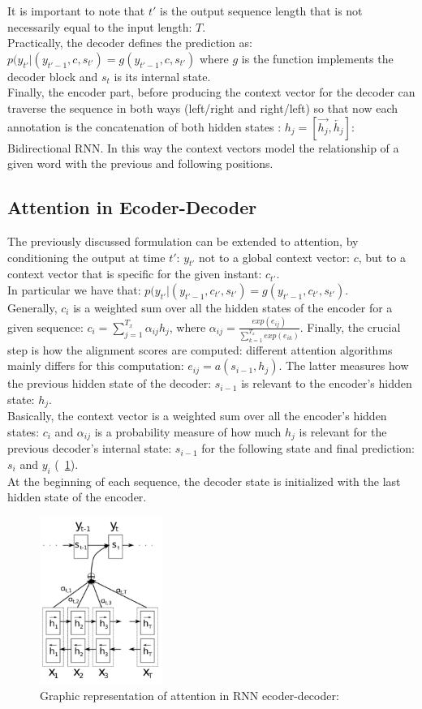 \documentclass[LaM,binding=0.6cm]{sapthesis}
\begin{document}
It is important to note that $t'$ is the output sequence length that is not necessarily equal to the input length: $T$.\\Practically, the decoder defines the prediction as: $p(y_{t'}|(y_{t'-1},c,s_{t'})=g(y_{t'-1},c,s_{t'})$ where $g$ is the function implements the decoder block and $s_t$ is its internal state.\\Finally, the encoder part, before producing the context vector for the decoder can traverse the sequence in both ways (left/right and right/left) so that now each annotation is the concatenation of both hidden states : $h_j = [\overrightarrow{h_j},\overleftarrow{h_j}]$: Bidirectional RNN. In this way the context vectors model the relationship of a given word with the previous and following positions.

\subsection{Attention in Ecoder-Decoder}
The previously discussed formulation can be extended to attention, by conditioning the output at time $t'$: $y_{t'}$ not to a global context vector: $c$, but to a context vector that is specific for the given instant: $c_{t'}$.\\In particular we have that: $p(y_{t'}|(y_{t'-1},c_{t'},s_{t'})=g(y_{t'-1},c_{t'},s_{t'})$.\\Generally, $c_{i}$ is a weighted sum over all the hidden states of the encoder for a given sequence: $c_{i} = \sum_{j=1}^{T_x}\alpha_{ij}h_j$, where $\alpha_{ij}=\frac{exp(e_{ij})}{\sum_{k=1}^{T_x}exp(e_{ik})}$. Finally, the crucial step is how the alignment scores are computed: different attention algorithms mainly differs for this computation: $e_{ij}=a(s_{i-1},h_j)$. The latter measures how the previous hidden state of the decoder: $s_{i-1}$ is relevant to the encoder's hidden state: $h_j$.\\Basically, the context vector is a weighted sum over all the encoder's hidden states: $c_{i}$ and $\alpha_{ij}$ is a probability measure of how much $h_j$ is relevant for the previous decoder's internal state: $s_{i-1}$ for the following state and final prediction: $s_i$ and $y_i$ (~\ref{fig:encdecatt}).\\At the beginning of each sequence, the decoder state is initialized with the last hidden state of the encoder.
\begin{figure}[H]  \centering
	\includegraphics[width=40mm,scale=0.5]{encdecatt}
	\caption{Graphic representation of attention in RNN ecoder-decoder: \cite{psy}}
	\label{fig:encdecatt}
\end{figure}
\end{document}
